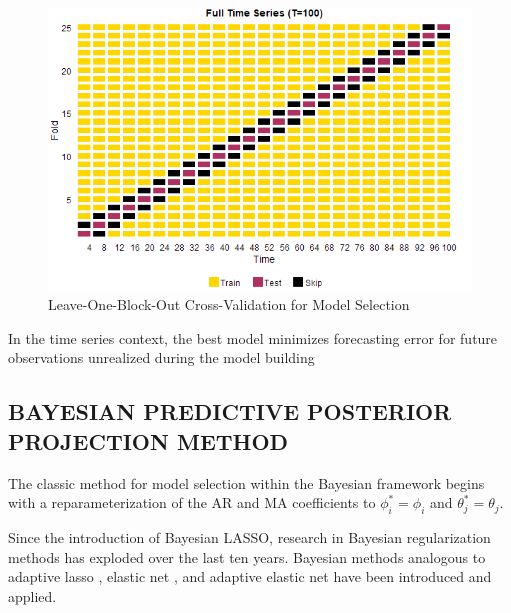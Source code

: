 \begin{figure}[htbp!]
	\caption{Leave-One-Block-Out Cross-Validation for Model Selection}
	\label{fig:lobocvplots}
	\includegraphics[scale=0.7]{lobocvplots}
\end{figure}

In the time series context, the best model minimizes forecasting error for future observations  unrealized during the model building  

\subsection{BAYESIAN PREDICTIVE POSTERIOR PROJECTION METHOD}
The classic method for model selection within the Bayesian framework begins with a reparameterization of the AR and MA coefficients to $\phi_i^*=\phi_i$ and $\theta_j^*=\theta_j$.

Since the introduction of Bayesian LASSO, research in Bayesian regularization methods has exploded over the last ten years. Bayesian methods analogous to adaptive lasso \citep{Leng2014}, elastic net \citep{Li2010a}, and adaptive elastic net \citep{Stankiewicz2015} have been introduced and applied. \cite{Polson2010}





